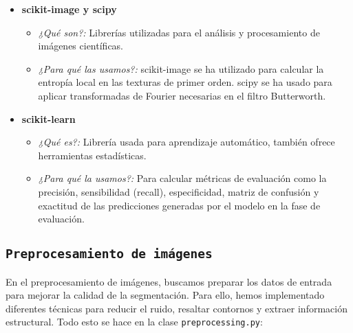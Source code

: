 \documentclass[12pt]{article}
\begin{document}
\begin{itemize}
    \item \textbf{scikit-image y scipy} \cite{skimage, scipy}
    \begin{itemize}
        \item \textit{¿Qué son?:} Librerías utilizadas para el análisis y procesamiento de imágenes científicas.
        \item \textit{¿Para qué las usamos?:} scikit-image se ha utilizado para calcular la entropía local en las texturas de primer orden. scipy se ha usado para aplicar transformadas de Fourier necesarias en el filtro Butterworth.
    \end{itemize}

    \item \textbf{scikit-learn} \cite{sklearn}
    \begin{itemize}
        \item \textit{¿Qué es?:} Librería usada para aprendizaje automático, también ofrece herramientas estadísticas.
        \item \textit{¿Para qué la usamos?:} Para calcular métricas de evaluación como la precisión, sensibilidad (recall), especificidad, matriz de confusión y exactitud de las predicciones generadas por el modelo en la fase de evaluación.
    \end{itemize}

\end{itemize}

\subsection{\texttt{Preprocesamiento de imágenes}}
En el preprocesamiento de imágenes, buscamos preparar los datos de entrada para mejorar la calidad de la segmentación. Para ello, hemos implementado diferentes técnicas para reducir el ruido, resaltar contornos y extraer información estructural. Todo esto se hace en la clase \texttt{preprocessing.py}: 
\end{document}
